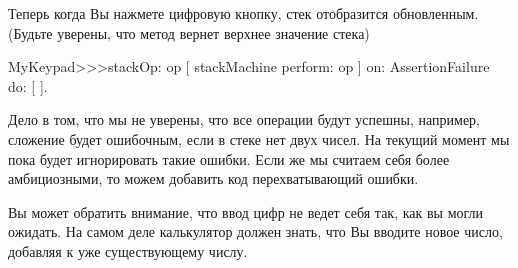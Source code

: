 \documentclass[a4paper,10pt,twoside]{book}
\begin{document}
Теперь когда Вы нажмете цифровую кнопку, стек отобразится обновленным.
(Будьте уверены, что метод  вернет верхнее
значение стека)



\begin{code}{}
MyKeypad>>>stackOp: op
	[ stackMachine perform: op ] on: AssertionFailure do: [ ].
\end{code}


Дело в том, что мы не уверены, что все операции будут успешны, например,
сложение будет ошибочным, если в стеке нет двух чисел.
На текущий момент мы пока будет игнорировать такие ошибки.
Если же мы считаем себя более амбициозными, то можем добавить код
перехватывающий ошибки.




Вы может обратить внимание, что ввод цифр не ведет себя так,
как вы могли ожидать. На самом деле калькулятор должен знать, что Вы
вводите новое число, добавляя к уже существующему числу.


\end{document}
